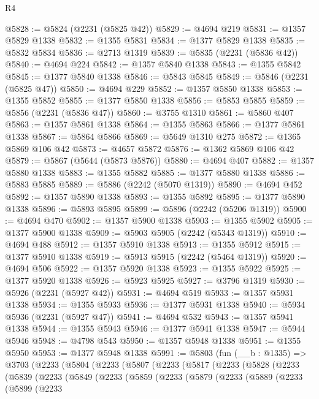 \begin{lexlean}{R4}
\begin{coremodule}
@5828 := @5824 (@2231 (@5825 @42))
@5829 := @4694 @219
@5831 := @1357 @5829 @1338
@5832 := @1355 @5831
@5834 := @1377 @5829 @1338
@5835 := @5832 @5834
@5836 := @2713 @1319
@5839 := @5835 (@2231 (@5836 @42))
@5840 := @4694 @224
@5842 := @1357 @5840 @1338
@5843 := @1355 @5842
@5845 := @1377 @5840 @1338
@5846 := @5843 @5845
@5849 := @5846 (@2231 (@5825 @47))
@5850 := @4694 @229
@5852 := @1357 @5850 @1338
@5853 := @1355 @5852
@5855 := @1377 @5850 @1338
@5856 := @5853 @5855
@5859 := @5856 (@2231 (@5836 @47))
@5860 := @3755 @1310
@5861 := @5860 @407
@5863 := @1357 @5861 @1338
@5864 := @1355 @5863
@5866 := @1377 @5861 @1338
@5867 := @5864 @5866
@5869 := @5649 @1310 @275
@5872 := @1365 @5869 @106 @42
@5873 := @4657 @5872
@5876 := @1362 @5869 @106 @42
@5879 := @5867 (@5644 (@5873 @5876))
@5880 := @4694 @407
@5882 := @1357 @5880 @1338
@5883 := @1355 @5882
@5885 := @1377 @5880 @1338
@5886 := @5883 @5885
@5889 := @5886 (@2242 (@5070 @1319))
@5890 := @4694 @452
@5892 := @1357 @5890 @1338
@5893 := @1355 @5892
@5895 := @1377 @5890 @1338
@5896 := @5893 @5895
@5899 := @5896 (@2242 (@5206 @1319))
@5900 := @4694 @470
@5902 := @1357 @5900 @1338
@5903 := @1355 @5902
@5905 := @1377 @5900 @1338
@5909 := @5903 @5905 (@2242 (@5343 @1319))
@5910 := @4694 @488
@5912 := @1357 @5910 @1338
@5913 := @1355 @5912
@5915 := @1377 @5910 @1338
@5919 := @5913 @5915 (@2242 (@5464 @1319))
@5920 := @4694 @506
@5922 := @1357 @5920 @1338
@5923 := @1355 @5922
@5925 := @1377 @5920 @1338
@5926 := @5923 @5925
@5927 := @3796 @1319
@5930 := @5926 (@2231 (@5927 @42))
@5931 := @4694 @519
@5933 := @1357 @5931 @1338
@5934 := @1355 @5933
@5936 := @1377 @5931 @1338
@5940 := @5934 @5936 (@2231 (@5927 @47))
@5941 := @4694 @532
@5943 := @1357 @5941 @1338
@5944 := @1355 @5943
@5946 := @1377 @5941 @1338
@5947 := @5944 @5946
@5948 := @4798 @543
@5950 := @1357 @5948 @1338
@5951 := @1355 @5950
@5953 := @1377 @5948 @1338
@5991 := @5803
    (fun (__b : @1335) =>
    @3703
      (@2233
        (@5804
          (@2233
            (@5807
              (@2233
                (@5817
                  (@2233
                    (@5828
                      (@2233
                        (@5839
                          (@2233
                            (@5849
                              (@2233
                                (@5859
                                  (@2233
                                    (@5879
                                      (@2233
                                        (@5889
                                          (@2233
                                            (@5899
                                              (@2233

\end{coremodule}
\end{lexlean}
